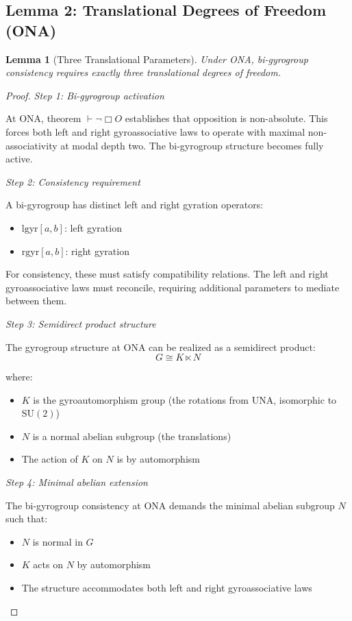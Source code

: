 \documentclass[11pt,a4paper]{article}
\newtheorem{lemma}[theorem]{Lemma}
\theoremstyle{definition}
\theoremstyle{remark}
\begin{document}
\subsection{Lemma 2: Translational Degrees of Freedom (ONA)}

\begin{lemma}[Three Translational Parameters]
Under ONA, bi-gyrogroup consistency requires exactly three translational degrees of freedom.
\end{lemma}

\begin{proof}
\textit{Step 1: Bi-gyrogroup activation}

At ONA, theorem $\vdash \neg\Box O$ establishes that opposition is non-absolute. This forces both left and right gyroassociative laws to operate with maximal non-associativity at modal depth two. The bi-gyrogroup structure becomes fully active.

\textit{Step 2: Consistency requirement}

A bi-gyrogroup has distinct left and right gyration operators:
\begin{itemize}
\item $\mathrm{lgyr}[a,b]$: left gyration
\item $\mathrm{rgyr}[a,b]$: right gyration
\end{itemize}

For consistency, these must satisfy compatibility relations. The left and right gyroassociative laws must reconcile, requiring additional parameters to mediate between them.

\textit{Step 3: Semidirect product structure}

The gyrogroup structure at ONA can be realized as a semidirect product:
\begin{equation}
G \cong K \ltimes N
\end{equation}

where:
\begin{itemize}
\item $K$ is the gyroautomorphism group (the rotations from UNA, isomorphic to $\mathrm{SU}(2)$)
\item $N$ is a normal abelian subgroup (the translations)
\item The action of $K$ on $N$ is by automorphism
\end{itemize}

\textit{Step 4: Minimal abelian extension}

The bi-gyrogroup consistency at ONA demands the minimal abelian subgroup $N$ such that:
\begin{itemize}
\item $N$ is normal in $G$
\item $K$ acts on $N$ by automorphism
\item The structure accommodates both left and right gyroassociative laws
\end{itemize}


\end{proof}
\end{document}
